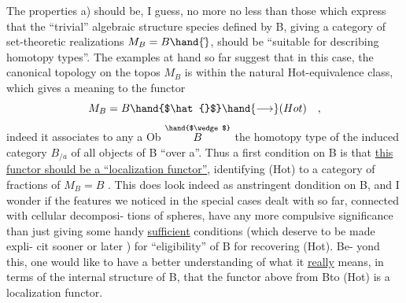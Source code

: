 The properties a) should be, I guess, no more no less than those
which express that the ``trivial'' algebraic structure species defined by
B, giving a category of set-theoretic realizations $M_B = B\hand{\hat{}}$, should be
``suitable for describing homotopy types''. The examples at hand so
far suggest that in this case, the canonical topology on the topos $M_B$
is within the natural Hot-equivalence class, which gives a meaning to
the functor
\[ M_B = B\hand{$\hat{}$} \hand{\longrightarrow} (Hot) \quad , \]
indeed it associates to any a \hand{$\in$} Ob $\overset{\hand{$\wedge$}}{B}$ the homotopy type of the induced
category $B_{/a}$ of all objects of B ``over a''. Thus a first condition on
B is that \uline{this functor should be a ``localization functor''}, identifying
(Hot) to a category of fractions of $M_B = B$\hand{$\hat{}$} . This does look indeed as
anstringent dondition on B, and I wonder if the features we noticed in
the special cases dealt with so far, connected with cellular decomposi-%
tions of spheres, have any more compulsive significance than just
giving some handy \uline{sufficient} conditions (which deserve to be made expli-%
cit sooner or later \hand{!}) for ``eligibility'' of B for recovering (Hot). Be-%
yond this, one would  like to have a better understanding of what it
\uline{really} means, in terms of the internal structure of B, that the
functor above from B\hand{$\hat{}$}\hand{/}to (Hot) is a localization functor.
